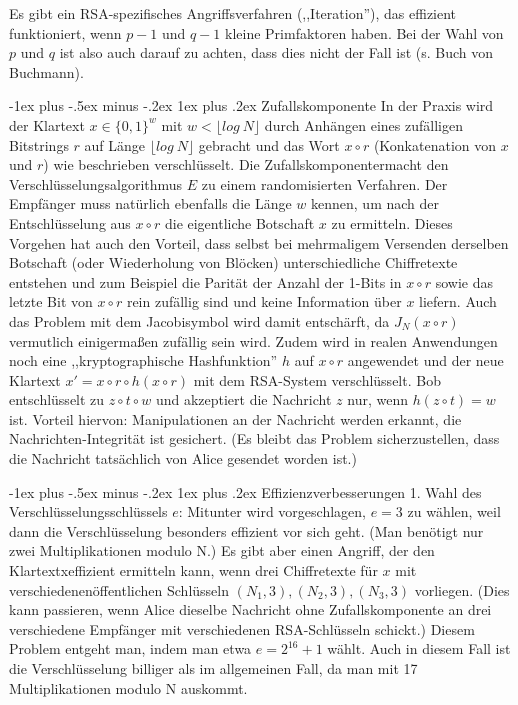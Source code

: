 \documentclass[a4paper]{article}
\makeatletter
\renewcommand{\subsubsection}{\@startsection{subsubsection}{3}{0mm}%
 {-1ex plus -.5ex minus -.2ex}%
 {1ex plus .2ex}%
 {\normalfont\small\bfseries}}
\makeatother
\begin{document}
\begin{multicols}{3}
        Es gibt ein RSA-spezifisches Angriffsverfahren (,,Iteration''), das effizient funktioniert, wenn $p-1$ und $q-1$ kleine Primfaktoren haben. Bei der Wahl von $p$ und $q$ ist also auch darauf zu achten, dass dies nicht der Fall ist (s. Buch von Buchmann).

        \subsubsection{Zufallskomponente}
        In der Praxis wird der Klartext $x\in\{0,1\}^w$ mit $w<\lfloor log\ N\rfloor$ durch Anhängen eines zufälligen Bitstrings $r$ auf Länge $\lfloor log\ N\rfloor$ gebracht und das Wort $x\circ r$ (Konkatenation von $x$ und $r$) wie beschrieben verschlüsselt. Die Zufallskomponentermacht den Verschlüsselungsalgorithmus $E$ zu einem randomisierten Verfahren. Der Empfänger muss natürlich ebenfalls die Länge $w$ kennen, um nach der Entschlüsselung aus $x\circ r$ die eigentliche Botschaft $x$ zu ermitteln. Dieses Vorgehen hat auch den Vorteil, dass selbst bei mehrmaligem Versenden derselben Botschaft (oder Wiederholung von Blöcken) unterschiedliche Chiffretexte entstehen und zum Beispiel die Parität der Anzahl der 1-Bits in $x\circ r$ sowie das letzte Bit von $x\circ r$ rein zufällig sind und keine Information über $x$ liefern. Auch das Problem mit dem Jacobisymbol wird damit entschärft, da $J_N(x\circ r)$ vermutlich einigermaßen zufällig sein wird. Zudem wird in realen Anwendungen noch eine ,,kryptographische Hashfunktion'' $h$ auf $x\circ r$ angewendet und der neue Klartext $x'=x\circ r\circ h(x\circ r)$ mit dem RSA-System verschlüsselt. Bob entschlüsselt zu $z\circ t\circ w$ und akzeptiert die Nachricht $z$ nur, wenn $h(z\circ t)=w$ ist. Vorteil hiervon: Manipulationen an der Nachricht werden erkannt, die Nachrichten-Integrität
        ist gesichert. (Es bleibt das Problem sicherzustellen, dass die Nachricht tatsächlich von Alice gesendet worden ist.)

        \subsubsection{Effizienzverbesserungen}
        1. Wahl des Verschlüsselungsschlüssels $e$:
        Mitunter wird vorgeschlagen, $e=3$ zu wählen, weil dann die Verschlüsselung besonders effizient vor sich geht. (Man benötigt nur zwei Multiplikationen modulo N.) Es gibt aber einen Angriff, der den Klartextxeffizient ermitteln kann, wenn drei Chiffretexte für $x$ mit verschiedenenöffentlichen Schlüsseln $(N_1,3),(N_2,3),(N_3,3)$ vorliegen. (Dies kann passieren, wenn Alice dieselbe Nachricht ohne Zufallskomponente an drei verschiedene Empfänger mit verschiedenen RSA-Schlüsseln schickt.)
        Diesem Problem entgeht man, indem man etwa $e=2^{16}+1$ wählt. Auch in diesem Fall ist die Verschlüsselung billiger als im allgemeinen Fall, da man mit 17 Multiplikationen modulo N auskommt.


\end{multicols}
\end{document}

